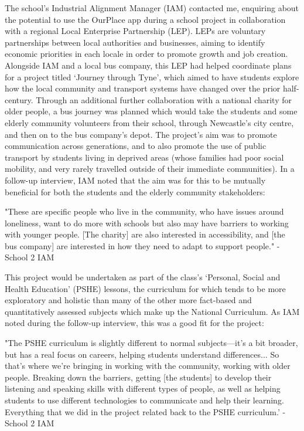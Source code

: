 The school's Industrial Alignment Manager (IAM) contacted me, enquiring about the potential to use the OurPlace app during a school project in collaboration with a regional Local Enterprise Partnership (LEP). LEPs are voluntary partnerships between local authorities and businesses, aiming to identify economic priorities in each locale in order to promote growth and job creation. Alongside IAM and a local bus company, this LEP had helped coordinate plans for a project titled `Journey through Tyne', which aimed to have students explore how the local community and transport systems have changed over the prior half-century. Through an additional further collaboration with a national charity for older people, a bus journey was planned which would take the students and some elderly community volunteers from their school, through Newcastle's city centre, and then on to the bus company's depot. The project's aim was to promote communication across generations, and to also promote the use of public transport by students living in deprived areas (whose families had poor social mobility, and very rarely travelled outside of their immediate communities). In a follow-up interview, IAM noted that the aim was for this to be mutually beneficial for both the students and the elderly community stakeholders:

\begin{displayquote}
"These are specific people who live in the community, who have issues around loneliness, want to do more with schools but also may have barriers to working with younger people. [The charity] are also interested in accessibility, and [the bus company] are interested in how they need to adapt to support people." - School 2 IAM
\end{displayquote}

This project would be undertaken as part of the class's `Personal, Social and Health Education' (PSHE) lessons, the curriculum for which tends to be more exploratory and holistic than many of the other more fact-based and quantitatively assessed subjects which make up the National Curriculum. As IAM noted during the follow-up interview, this was a good fit for the project:

\begin{displayquote}
"The PSHE curriculum is slightly different to normal subjects---it's a bit broader, but has a real focus on careers, helping students understand differences... So that's where we're bringing in working with the community, working with older people. Breaking down the barriers, getting [the students] to develop their listening and speaking skills with different types of people, as well as helping students to use different technologies to communicate and help their learning. Everything that we did in the project related back to the PSHE curriculum.' - School 2 IAM
\end{displayquote}


